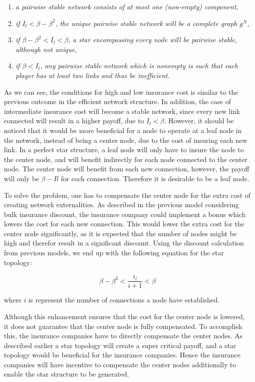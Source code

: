 \begin{enumerate}

\item \textit{a pairwise stable network consists of at most one (non-empty) component,}
\item \textit{if $I_{l}<\beta - \beta^2$, the unique pairwise stable network will be a complete graph $g^N$, }
\item \textit{if $\beta - \beta^2 < I_{l} < \beta $, a star encompassing every node will be pairwise stable, although not unique,}
\item \textit{if $\beta < I_{l}$, any pairwise stable network which is nonempty is such that each player has at least two links and thus be inefficient. }
\end{enumerate}

As we can see, the conditions for high and low insurance cost is similar to the previous outcome in the efficient network structure. In addition, the case of intermediate insurance cost will become a stable network, since every new link connected will result in a higher payoff, due to $I_{l} < \beta$. However, it should be noticed that it would be more beneficial for a node to operate at a leaf node in the network, instead of being a center node, due to the cost of insuring each new link. In a perfect star structure, a leaf node will only have to insure the node to the center node, and will benefit indirectly for each node connected to the center node. The center node will benefit from each new connection, however, the payoff will only be $\beta - I{l}$ for each connection. Therefore it is desirable to be a leaf node. 

To solve the problem, one has to compensate the center node for the extra cost of creating network externalities. As described in the previous model considering bulk insurance discount, the insurance company could implement a bonus which lowers the cost for each new connection. This would lower the extra cost for the center node significantly, as it is expected that the number of nodes might be high and therefor result in a significant discount. 
Using the discount calculation from previous models, we end up with the following equation for the star topology:

\begin{equation}
\beta-\beta^2<\frac{i_{l}}{i+1}< \beta
\end{equation}



where $i $ is represent the number of connections a node have established. 

Although this enhancement ensures that the cost for the center node is lowered, it does not guarantee that the center node is fully compensated. To accomplish this, the insurance companies have to directly compensate the center nodes. As described earlier a star topology will create a super critical payoff, and a star topology would be beneficial for the insurance companies. Hence the insurance companies will have incentive to compensate the center nodes additionally to enable the star structure to be generated. 




